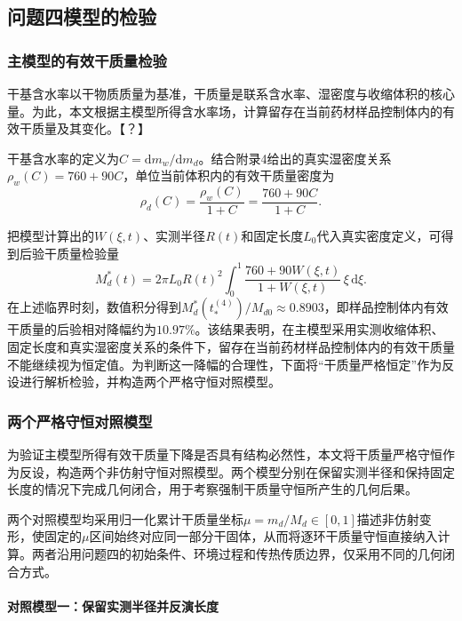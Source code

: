 \documentclass[withoutpreface,bwprint]{cumcmthesis}
\begin{document}
\subsection{问题四模型的检验}

\subsubsection{主模型的有效干质量检验}

干基含水率以干物质质量为基准，干质量是联系含水率、湿密度与收缩体积的核心量。为此，本文根据主模型所得含水率场，计算留存在当前药材样品控制体内的有效干质量及其变化。【？】

干基含水率的定义为$C=\mathrm dm_w/\mathrm dm_d$。结合附录4给出的真实湿密度关系$\rho_w(C)=760+90C$，单位当前体积内的有效干质量密度为
\begin{equation}
\boxed{
\rho_d(C)=\frac{\rho_w(C)}{1+C}
=\frac{760+90C}{1+C}.
}
\label{eq:q4-check-dry-density}
\end{equation}

把模型计算出的$W(\xi,t)$、实测半径$R(t)$和固定长度$L_0$代入真实密度定义，可得到后验干质量检验量
\begin{equation}
M_d^*(t)=2\pi L_0R(t)^2
\int_0^1\frac{760+90W(\xi,t)}{1+W(\xi,t)}\,\xi\,\mathrm d\xi.
\label{eq:q4-check-mass-proxy}
\end{equation}
在上述临界时刻，数值积分得到$M_d^*(t_*^{(4)})/M_{d0}\approx0.8903$，即样品控制体内有效干质量的后验相对降幅约为$10.97\%$。该结果表明，在主模型采用实测收缩体积、固定长度和真实湿密度关系的条件下，留存在当前药材样品控制体内的有效干质量不能继续视为恒定值。为判断这一降幅的合理性，下面将“干质量严格恒定”作为反设进行解析检验，并构造两个严格守恒对照模型。

\subsubsection{两个严格守恒对照模型}

为验证主模型所得有效干质量下降是否具有结构必然性，本文将干质量严格守恒作为反设，构造两个非仿射守恒对照模型。两个模型分别在保留实测半径和保持固定长度的情况下完成几何闭合，用于考察强制干质量守恒所产生的几何后果。

两个对照模型均采用归一化累计干质量坐标$\mu=m_d/M_d\in[0,1]$描述非仿射变形，使固定的$\mu$区间始终对应同一部分干固体，从而将逐环干质量守恒直接纳入计算。两者沿用问题四的初始条件、环境过程和传热传质边界，仅采用不同的几何闭合方式。

\paragraph{对照模型一：保留实测半径并反演长度}
\end{document}
